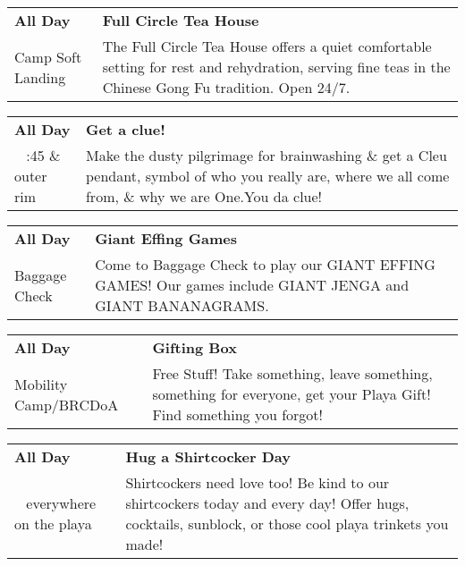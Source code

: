 \begin{tabular}{ p{1in} p{2.2in} }
    \textbf{All Day} & \textbf{Full Circle Tea House} \\
    Camp Soft Landing \newline  & The Full Circle Tea House offers a quiet comfortable setting for rest and rehydration, serving fine teas in the Chinese Gong Fu tradition. Open 24/7. \\
    \hline 
\end{tabular}
    
\begin{tabular}{ p{1in} p{2.2in} }
    \textbf{All Day} & \textbf{Get a clue!} \\
    ~ \newline 3:45 \& outer rim & Make the dusty pilgrimage for brainwashing \& get a Cleu pendant, symbol of who you really are, where we all come from, \& why we are One.You da clue! \\
    \hline 
\end{tabular}
    
\begin{tabular}{ p{1in} p{2.2in} }
    \textbf{All Day} & \textbf{Giant Effing Games} \\
    Baggage Check \newline  & Come to Baggage Check to play our GIANT EFFING GAMES! Our games include GIANT JENGA and GIANT BANANAGRAMS. \\
    \hline 
\end{tabular}
    
\begin{tabular}{ p{1in} p{2.2in} }
    \textbf{All Day} & \textbf{Gifting Box} \\
    Mobility Camp/BRCDoA \newline  & Free Stuff! Take something, leave something, something for everyone, get your Playa Gift! Find something you forgot! \\
    \hline 
\end{tabular}
    
\begin{tabular}{ p{1in} p{2.2in} }
    \textbf{All Day} & \textbf{Hug a Shirtcocker Day} \\
    ~ \newline everywhere on the playa & Shirtcockers need love too! Be kind to our shirtcockers today and every day! Offer hugs, cocktails, sunblock, or those cool playa trinkets you made! \\
    \hline 
\end{tabular}
    
